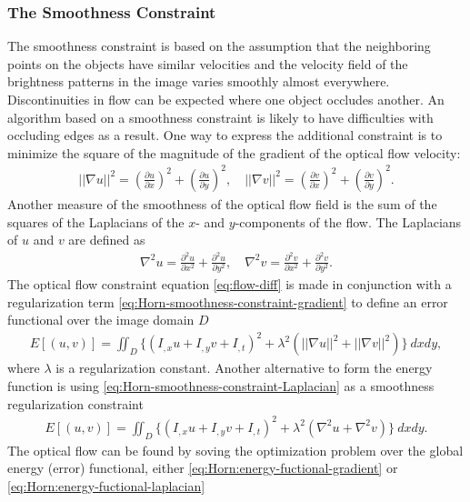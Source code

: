 \documentclass[letterpaper,12pt]{article}
\begin{document}
\subsubsection*{The Smoothness Constraint}
The smoothness constraint is based on the assumption that the neighboring points on the objects have similar velocities and the velocity field of the
brightness patterns in the image varies smoothly almost everywhere. Discontinuities in flow can be expected where one object occludes another. An algorithm based on a smoothness constraint is likely to have difficulties with
occluding edges as a result. One way to express the additional constraint is to minimize the square of the
magnitude of the gradient of the optical flow velocity: 
\begin{align}
|| \nabla u ||^2 = (\frac{\partial u}{\partial x})^2 + (\frac{\partial u}{\partial y})^2, \quad || \nabla v ||^2 = (\frac{\partial v}{\partial x})^2 + (\frac{\partial v}{\partial y})^2.
\label{eq:Horn-smoothness-constraint-gradient}
\end{align}
Another measure of the smoothness of the optical flow field is the sum of the squares of the Laplacians of the $x$- and $y$-components of the flow. The Laplacians of $u$ and $v$ are defined as
\begin{align}
\nabla^2 u = \frac{\partial^2 u}{\partial x^2} + \frac{\partial^2 u}{\partial y^2}, \quad \nabla^2 v = \frac{\partial^2 v}{\partial x^2} + \frac{\partial^2 v}{\partial y^2}.
\label{eq:Horn-smoothness-constraint-Laplacian}
\end{align}
The optical flow constraint equation \eqref{eq:flow-diff} is made in conjunction with a regularization term \eqref{eq:Horn-smoothness-constraint-gradient} to define an error functional over the image domain $D$
\begin{align}
E[(u,v)] = \iint_D \Big \{  (I_{,x} u + I_{,y} v + I_{,t})^2 + \lambda^2 ( || \nabla u ||^2 + ||\nabla v|| ^2 ) \Big \} ~ dx dy,  
\label{eq:Horn:energy-fuctional-gradient}
\end{align}
where $\lambda$ is a regularization constant. Another alternative to form the energy function is using \eqref{eq:Horn-smoothness-constraint-Laplacian} as a smoothness regularization constraint
\begin{align}
E[(u,v)] = \iint_D \Big \{  (I_{,x} u + I_{,y} v + I_{,t})^2 + \lambda^2 ( \nabla^2 u + \nabla^2 v ) \Big \} ~ dx dy.  
\label{eq:Horn:energy-fuctional-laplacian}
\end{align}   
The optical flow can be found by soving the optimization problem over the global energy (error) functional, either \eqref{eq:Horn:energy-fuctional-gradient} or \eqref{eq:Horn:energy-fuctional-laplacian}
\end{document}
